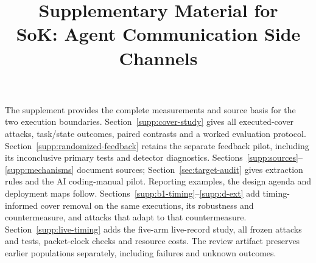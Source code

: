 \documentclass[conference,compsoc]{IEEEtran}
\title{Supplementary Material for\\SoK: Agent Communication Side Channels}
\author{}
\begin{document}

\raggedbottom
\pagestyle{plain}
\maketitle
\thispagestyle{plain}
\noindent The supplement provides the complete measurements and source basis for the two execution boundaries. Section~\ref{supp:cover-study} gives all executed-cover attacks, task/state outcomes, paired contrasts and a worked evaluation protocol. Section~\ref{supp:randomized-feedback} retains the separate feedback pilot, including its inconclusive primary tests and detector diagnostics. Sections~\ref{supp:sources}--\ref{supp:mechanisms} document sources; Section~\ref{sec:target-audit} gives extraction rules and the AI coding-manual pilot. Reporting examples, the design agenda and deployment maps follow. Sections~\ref{supp:b1-timing}--\ref{supp:d-ext} add timing-informed cover removal on the same executions, its robustness and countermeasure, and attacks that adapt to that countermeasure. Section~\ref{supp:live-timing} adds the five-arm live-record study, all frozen attacks and tests, packet-clock checks and resource costs. The review artifact preserves earlier populations separately, including failures and unknown outcomes.

\clearpage\onecolumn\twocolumn







\clearpage
\clearpage
\clearpage
\clearpage
\clearpage\onecolumn\twocolumn


\end{document}
